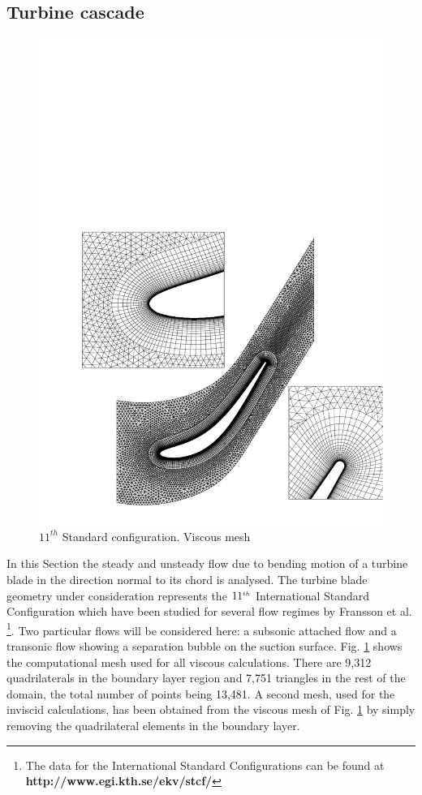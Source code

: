%
%
%
\subsection{Turbine cascade}
\label{stand11.subsec}
%
%
\begin{figure}
 \centerline{\includegraphics[width=120mm,clip=t]{CHAP_LINEAR/FIGURE/mesh_11th.pdf}}
 \caption{$11^{th}$ Standard configuration. Viscous mesh}
 \label{mesh_11th.fig}
\end{figure}
%
 In this Section the steady and unsteady flow due to bending motion
 of a turbine blade in the direction normal to its chord is analysed.
 The turbine blade geometry under consideration represents the
 $11^{\mbox{\tiny $th$}}$ International Standard Configuration which have been
 studied for several flow regimes by Fransson et al.
 \citeyear{Bolcs:2}\footnote{The data for the International Standard Configurations
 can be found at {\bf http://www.egi.kth.se/ekv/stcf/} }.
 Two particular flows  will be considered here:
 a subsonic attached flow  and a transonic flow showing a separation
 bubble on the suction surface.
 Fig. \ref{mesh_11th.fig} shows the computational mesh used for all viscous
 calculations. There are 9,312 quadrilaterals in the
 boundary layer region and 7,751 triangles in the rest of the domain, the total  number
 of points being 13,481. A second mesh, used for the inviscid calculations, has
 been obtained from the viscous mesh of Fig. \ref{mesh_11th.fig} by simply removing
 the quadrilateral elements in the boundary layer.

